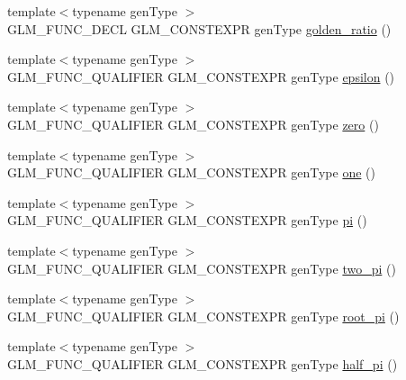 \begin{DoxyCompactItemize}
{\footnotesize template$<$typename gen\+Type $>$ }\\G\+L\+M\+\_\+\+F\+U\+N\+C\+\_\+\+D\+E\+C\+L G\+L\+M\+\_\+\+C\+O\+N\+S\+T\+E\+X\+P\+R gen\+Type \hyperlink{group__gtc__constants_ga748cf8642830657c5b7eae04d0a80899}{golden\+\_\+ratio} ()
\item 
{\footnotesize template$<$typename gen\+Type $>$ }\\G\+L\+M\+\_\+\+F\+U\+N\+C\+\_\+\+Q\+U\+A\+L\+I\+F\+I\+E\+R G\+L\+M\+\_\+\+C\+O\+N\+S\+T\+E\+X\+P\+R gen\+Type \hyperlink{group__gtc__constants_ga2a1e57fc5592b69cfae84174cbfc9429}{epsilon} ()
\item 
{\footnotesize template$<$typename gen\+Type $>$ }\\G\+L\+M\+\_\+\+F\+U\+N\+C\+\_\+\+Q\+U\+A\+L\+I\+F\+I\+E\+R G\+L\+M\+\_\+\+C\+O\+N\+S\+T\+E\+X\+P\+R gen\+Type \hyperlink{group__gtc__constants_ga788f5a421fc0f40a1296ebc094cbaa8a}{zero} ()
\item 
{\footnotesize template$<$typename gen\+Type $>$ }\\G\+L\+M\+\_\+\+F\+U\+N\+C\+\_\+\+Q\+U\+A\+L\+I\+F\+I\+E\+R G\+L\+M\+\_\+\+C\+O\+N\+S\+T\+E\+X\+P\+R gen\+Type \hyperlink{group__gtc__constants_ga39c2fb227631ca25894326529bdd1ee5}{one} ()
\item 
{\footnotesize template$<$typename gen\+Type $>$ }\\G\+L\+M\+\_\+\+F\+U\+N\+C\+\_\+\+Q\+U\+A\+L\+I\+F\+I\+E\+R G\+L\+M\+\_\+\+C\+O\+N\+S\+T\+E\+X\+P\+R gen\+Type \hyperlink{group__gtc__constants_ga94bafeb2a0f23ab6450fed1f98ee4e45}{pi} ()
\item 
{\footnotesize template$<$typename gen\+Type $>$ }\\G\+L\+M\+\_\+\+F\+U\+N\+C\+\_\+\+Q\+U\+A\+L\+I\+F\+I\+E\+R G\+L\+M\+\_\+\+C\+O\+N\+S\+T\+E\+X\+P\+R gen\+Type \hyperlink{group__gtc__constants_gaa5276a4617566abcfe49286f40e3a256}{two\+\_\+pi} ()
\item 
{\footnotesize template$<$typename gen\+Type $>$ }\\G\+L\+M\+\_\+\+F\+U\+N\+C\+\_\+\+Q\+U\+A\+L\+I\+F\+I\+E\+R G\+L\+M\+\_\+\+C\+O\+N\+S\+T\+E\+X\+P\+R gen\+Type \hyperlink{group__gtc__constants_ga261380796b2cd496f68d2cf1d08b8eb9}{root\+\_\+pi} ()
\item 
{\footnotesize template$<$typename gen\+Type $>$ }\\G\+L\+M\+\_\+\+F\+U\+N\+C\+\_\+\+Q\+U\+A\+L\+I\+F\+I\+E\+R G\+L\+M\+\_\+\+C\+O\+N\+S\+T\+E\+X\+P\+R gen\+Type \hyperlink{group__gtc__constants_ga0c36b41d462e45641faf7d7938948bac}{half\+\_\+pi} ()
\item 

\end{DoxyCompactItemize}
